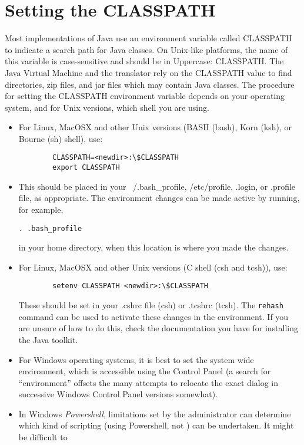 \section{Setting the CLASSPATH}\label{install_classpath}
Most implementations of Java use an environment variable called
CLASSPATH to indicate a search path for Java classes. On Unix-like
platforms, the name of this variable is case-sensitive and should be
in Uppercase: CLASSPATH. The Java Virtual Machine and the \nr{}
translator rely on the CLASSPATH value to find directories, zip files,
and jar files which may contain Java classes. 
The procedure for setting the CLASSPATH environment variable depends
on your operating system, and for Unix versions, which shell you are using.
\begin{itemize}
\item For Linux, MacOSX and other Unix versions (BASH (bash), Korn
  (ksh), or Bourne (sh) shell), use:
\begin{lstlisting}
        CLASSPATH=<newdir>:\$CLASSPATH 
        export CLASSPATH
\end{lstlisting}
\item This should be placed
  in your ~/.bash\_profile, /etc/profile, .login, or .profile file, as
  appropriate. The environment changes can be made active by running,
  for example,
\begin{lstlisting}
. .bash_profile
\end{lstlisting}
in your home directory, when this location is where you made the changes.
\item For Linux, MacOSX and other Unix versions (C shell (csh and tcsh)), use:
\begin{lstlisting}
        setenv CLASSPATH <newdir>:\$CLASSPATH 
\end{lstlisting}
These should be set in your .cshrc file (csh) or .tcshrc (tcsh). The
\texttt{rehash} command can be used to activate these changes in the environment. If you are unsure of how to do this, check the
documentation you have for installing the Java toolkit.
\item For Windows operating systems, it is best to set the system wide
  environment, which is accessible using the Control Panel (a search
  for ``environment'' offsets the many attempts to relocate the exact
  dialog in successive Windows Control Panel versions somewhat).
\item In Windows \emph{Powershell}, limitations set by the
  administrator can determine which kind of scripting (using
  Powershell, not \nr) can be undertaken. It might be difficult to

\end{itemize}
